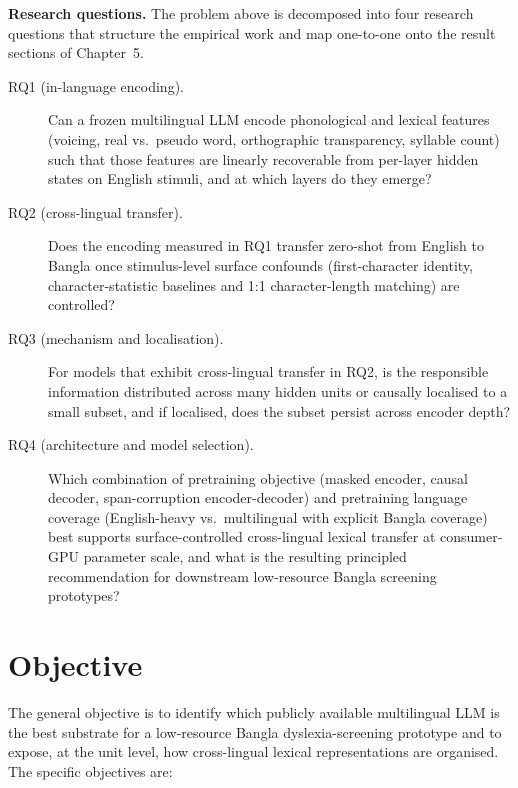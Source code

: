 \textbf{Research questions.} The problem above is decomposed into four research questions that structure the empirical work and map one-to-one onto the result sections of Chapter~5.

\begin{description}
    \item[RQ1 (in-language encoding).] Can a frozen multilingual LLM encode phonological and lexical features (voicing, real vs.\ pseudo word, orthographic transparency, syllable count) such that those features are linearly recoverable from per-layer hidden states on English stimuli, and at which layers do they emerge?

    \item[RQ2 (cross-lingual transfer).] Does the encoding measured in RQ1 transfer zero-shot from English to Bangla once stimulus-level surface confounds (first-character identity, character-statistic baselines and 1:1 character-length matching) are controlled?

    \item[RQ3 (mechanism and localisation).] For models that exhibit cross-lingual transfer in RQ2, is the responsible information distributed across many hidden units or causally localised to a small subset, and if localised, does the subset persist across encoder depth?

    \item[RQ4 (architecture and model selection).] Which combination of pretraining objective (masked encoder, causal decoder, span-corruption encoder-decoder) and pretraining language coverage (English-heavy vs.\ multilingual with explicit Bangla coverage) best supports surface-controlled cross-lingual lexical transfer at consumer-GPU parameter scale, and what is the resulting principled recommendation for downstream low-resource Bangla screening prototypes?
\end{description}

\section{Objective}

The general objective is to identify which publicly available multilingual LLM is the best substrate for a low-resource Bangla dyslexia-screening prototype and to expose, at the unit level, how cross-lingual lexical representations are organised. The specific objectives are:

